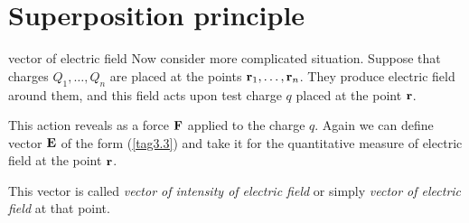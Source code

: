 \documentclass[10pt]{beamer}
\begin{document}
\section{ Superposition principle}
\begin{frame}[fragile]{vector of electric field}
%
    Now consider more complicated situation. Suppose that charges
$Q_1,\dots,Q_n$ are placed at the points $\bold r_1,\dots,\bold r_n$.
They produce electric field around them, and this field acts upon
test charge $q$ placed at the point $\bold r$. 

This action reveals
as a force $\bold F$ applied to the charge $q$. Again we can define
vector $\bold E$ of the form (\ref{tag3.3}) 
 and take it for the
quantitative measure of electric field at the point $\bold r$.


This vector is called \alert{{\it vector of intensity of electric field}
or simply {\it vector of electric field}} at that point.
%
\end{frame}
\end{document}
